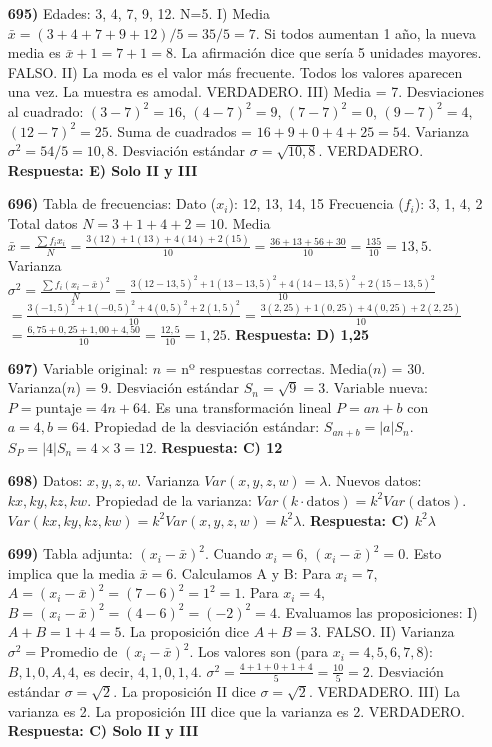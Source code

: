 \documentclass[12pt, a4paper]{article} %
\begin{document}
\begin{enumerate}
    \item[\bfseries 695)] Edades: {3, 4, 7, 9, 12}. N=5.
    I) Media $\bar{x} = (3+4+7+9+12)/5 = 35/5 = 7$. Si todos aumentan 1 año, la nueva media es $\bar{x}+1 = 7+1=8$. La afirmación dice que sería 5 unidades mayores. FALSO.
    II) La moda es el valor más frecuente. Todos los valores aparecen una vez. La muestra es amodal. VERDADERO.
    III) Media = 7. Desviaciones al cuadrado: $(3-7)^2=16$, $(4-7)^2=9$, $(7-7)^2=0$, $(9-7)^2=4$, $(12-7)^2=25$. Suma de cuadrados = $16+9+0+4+25 = 54$. Varianza $\sigma^2 = 54/5 = 10,8$. Desviación estándar $\sigma = \sqrt{10,8}$. VERDADERO.
    \textbf{Respuesta: E) Solo II y III}

    \item[\bfseries 696)] Tabla de frecuencias:
    Dato ($x_i$): 12, 13, 14, 15
    Frecuencia ($f_i$): 3, 1, 4, 2
    Total datos $N = 3+1+4+2 = 10$.
    Media $\bar{x} = \frac{\sum f_i x_i}{N} = \frac{3(12)+1(13)+4(14)+2(15)}{10} = \frac{36+13+56+30}{10} = \frac{135}{10} = 13,5$.
    Varianza $\sigma^2 = \frac{\sum f_i (x_i - \bar{x})^2}{N} = \frac{3(12-13,5)^2 + 1(13-13,5)^2 + 4(14-13,5)^2 + 2(15-13,5)^2}{10}$
    $= \frac{3(-1,5)^2 + 1(-0,5)^2 + 4(0,5)^2 + 2(1,5)^2}{10} = \frac{3(2,25) + 1(0,25) + 4(0,25) + 2(2,25)}{10}$
    $= \frac{6,75 + 0,25 + 1,00 + 4,50}{10} = \frac{12,5}{10} = 1,25$.
    \textbf{Respuesta: D) 1,25}

    \item[\bfseries 697)] Variable original: $n$ = nº respuestas correctas. Media($n$) = 30. Varianza($n$) = 9. Desviación estándar $S_n = \sqrt{9}=3$.
    Variable nueva: $P = \text{puntaje} = 4n + 64$. Es una transformación lineal $P = a n + b$ con $a=4, b=64$.
    Propiedad de la desviación estándar: $S_{a n + b} = |a| S_n$.
    $S_P = |4| S_n = 4 \times 3 = 12$.
    \textbf{Respuesta: C) 12}

    \item[\bfseries 698)] Datos: $x, y, z, w$. Varianza $Var(x,y,z,w) = \lambda$.
    Nuevos datos: $kx, ky, kz, kw$.
    Propiedad de la varianza: $Var(k \cdot \text{datos}) = k^2 Var(\text{datos})$.
    $Var(kx, ky, kz, kw) = k^2 Var(x, y, z, w) = k^2 \lambda$.
    \textbf{Respuesta: C) $k^2\lambda$}

    \item[\bfseries 699)] Tabla adjunta: $(x_i - \bar{x})^2$.
    Cuando $x_i=6$, $(x_i - \bar{x})^2 = 0$. Esto implica que la media $\bar{x} = 6$.
    Calculamos A y B:
    Para $x_i=7$, $A = (x_i - \bar{x})^2 = (7-6)^2 = 1^2 = 1$.
    Para $x_i=4$, $B = (x_i - \bar{x})^2 = (4-6)^2 = (-2)^2 = 4$.
    Evaluamos las proposiciones:
    I) $A+B = 1+4 = 5$. La proposición dice $A+B=3$. FALSO.
    II) Varianza $\sigma^2 = \text{Promedio de } (x_i - \bar{x})^2$. Los valores son (para $x_i=4,5,6,7,8$): $B, 1, 0, A, 4$, es decir, $4, 1, 0, 1, 4$.
    $\sigma^2 = \frac{4+1+0+1+4}{5} = \frac{10}{5} = 2$.
    Desviación estándar $\sigma = \sqrt{2}$. La proposición II dice $\sigma = \sqrt{2}$. VERDADERO.
    III) La varianza es 2. La proposición III dice que la varianza es 2. VERDADERO.
    \textbf{Respuesta: C) Solo II y III}


\end{enumerate}
\end{document}
